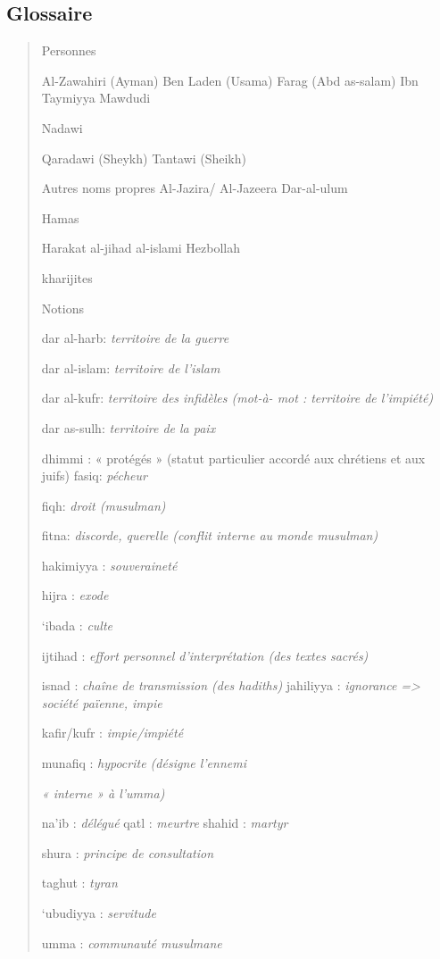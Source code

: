 \hypertarget{glossaire-4}{%
\subsection{\texorpdfstring{{Glossaire}}{Glossaire}}\label{glossaire-4}}

\begin{quote}
{Personnes}

Al-Zawahiri (Ayman) Ben Laden (Usama) Farag (Abd as-salam) Ibn Taymiyya
Mawdudi

Nadawi

Qaradawi (Sheykh) Tantawi (Sheikh)

{Autres noms propres} Al-Jazira/ Al-Jazeera Dar-al-ulum

Hamas

Harakat al-jihad al-islami Hezbollah

kharijites

{Notions}

dar al-harb: \emph{territoire de la guerre}

dar al-islam: \emph{territoire de l'islam}

dar al-kufr: \emph{territoire des infidèles (mot-à- mot : territoire de
l'impiété)}

dar as-sulh: \emph{territoire de la paix}

dhimmi : « protégés » (statut particulier accordé aux chrétiens et aux
juifs) fasiq: \emph{pécheur}

fiqh: \emph{droit (musulman)}

fitna: \emph{discorde, querelle (conflit interne au monde musulman)}

hakimiyya : \emph{souveraineté}

hijra : \emph{exode}

`ibada : \emph{culte}

ijtihad : \emph{effort personnel d'interprétation (des textes sacrés)}

isnad : \emph{chaîne de transmission (des hadiths)} jahiliyya :
\emph{ignorance =\textgreater{} société païenne, impie}

kafir/kufr : \emph{impie/impiété}

munafiq : \emph{hypocrite (désigne l'ennemi}

\emph{« interne » à l'umma)}

na'ib : \emph{délégué} qatl : \emph{meurtre} shahid : \emph{martyr}

shura : \emph{principe de consultation}

taghut : \emph{tyran}

`ubudiyya : \emph{servitude}

umma : \emph{communauté musulmane}
\end{quote}

